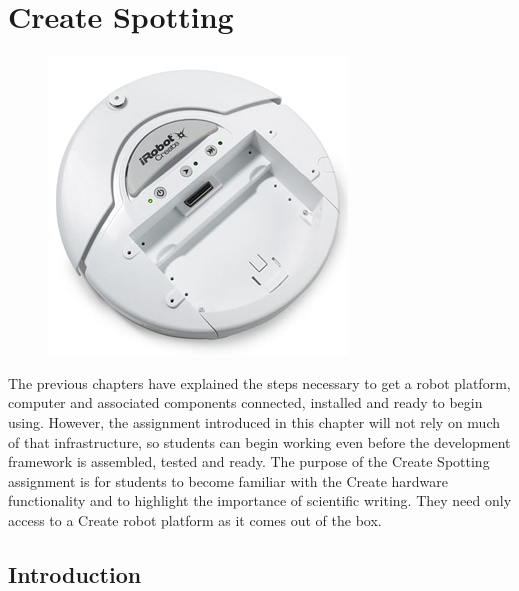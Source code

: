 

\chapter{Create Spotting}
\label{sec:create_spotting}

\begin{figure}[!h]
\centering
\includegraphics[width=0.8\columnwidth]{figures/4_create.jpg}
\end{figure}

\newpage

The previous chapters have explained the steps necessary to get a
robot platform, computer and associated components connected,
installed and ready to begin using.  However, the assignment
introduced in this chapter will not rely on much of that
infrastructure, so students can begin working even before the
development framework is assembled, tested and ready.  The purpose of
the Create Spotting assignment is for students to become familiar with
the Create hardware functionality and to highlight the importance of
scientific writing.  They need only access to a Create robot platform
as it comes out of the box.


\section{Introduction}

